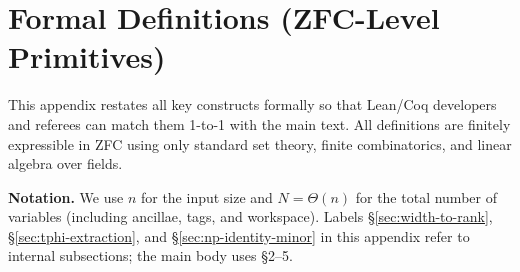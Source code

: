 \documentclass[12pt]{article}
\theoremstyle{definition}
\theoremstyle{definition}
\theoremstyle{remark}
\theoremstyle{remark}
\begin{document}

\section{Formal Definitions (ZFC-Level Primitives)}
\label{sec:formal-defs-zfc}

This appendix restates all key constructs formally so that Lean/Coq developers and referees can match them 1-to-1 with the main text. All definitions are finitely expressible in ZFC using only standard set theory, finite combinatorics, and linear algebra over fields.

\medskip
\noindent\textbf{Notation.}
We use $n$ for the input size and $N=\Theta(n)$ for the total number of variables (including ancillae, tags, and workspace).
Labels \S\ref{sec:width-to-rank}, \S\ref{sec:tphi-extraction}, and \S\ref{sec:np-identity-minor} in this appendix refer to internal subsections; the main body uses \S2--5.
\end{document}
